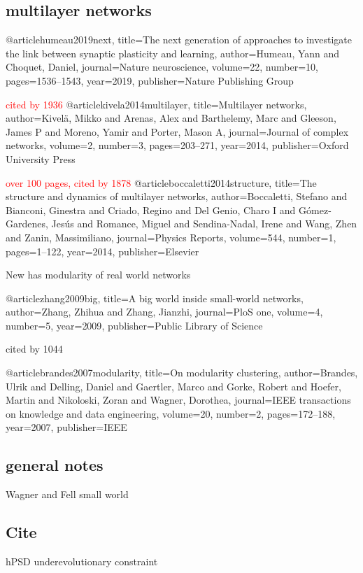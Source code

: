 \subsection{multilayer networks}@article{humeau2019next,
  title={The next generation of approaches to investigate the link between synaptic plasticity and learning},
  author={Humeau, Yann and Choquet, Daniel},
  journal={Nature neuroscience},
  volume={22},
  number={10},
  pages={1536--1543},
  year={2019},
  publisher={Nature Publishing Group}
}

\textcolor{red}{cited by 1936}
@article{kivela2014multilayer,
  title={Multilayer networks},
  author={Kivel{\"a}, Mikko and Arenas, Alex and Barthelemy, Marc and Gleeson, James P and Moreno, Yamir and Porter, Mason A},
  journal={Journal of complex networks},
  volume={2},
  number={3},
  pages={203--271},
  year={2014},
  publisher={Oxford University Press}
}

\textcolor{red}{over 100 pages, cited by 1878}
@article{boccaletti2014structure,
  title={The structure and dynamics of multilayer networks},
  author={Boccaletti, Stefano and Bianconi, Ginestra and Criado, Regino and Del Genio, Charo I and G{\'o}mez-Gardenes, Jes{\'u}s and Romance, Miguel and Sendina-Nadal, Irene and Wang, Zhen and Zanin, Massimiliano},
  journal={Physics Reports},
  volume={544},
  number={1},
  pages={1--122},
  year={2014},
  publisher={Elsevier}
}

New has modularity of real world networks

@article{zhang2009big,
  title={A big world inside small-world networks},
  author={Zhang, Zhihua and Zhang, Jianzhi},
  journal={PloS one},
  volume={4},
  number={5},
  year={2009},
  publisher={Public Library of Science}
}

cited by 1044

@article{brandes2007modularity,
  title={On modularity clustering},
  author={Brandes, Ulrik and Delling, Daniel and Gaertler, Marco and Gorke, Robert and Hoefer, Martin and Nikoloski, Zoran and Wagner, Dorothea},
  journal={IEEE transactions on knowledge and data engineering},
  volume={20},
  number={2},
  pages={172--188},
  year={2007},
  publisher={IEEE}
}


\subsection{general notes}
Wagner and Fell small world

\subsection{Cite}
\cite{bayes2011characterization} hPSD underevolutionary constraint

